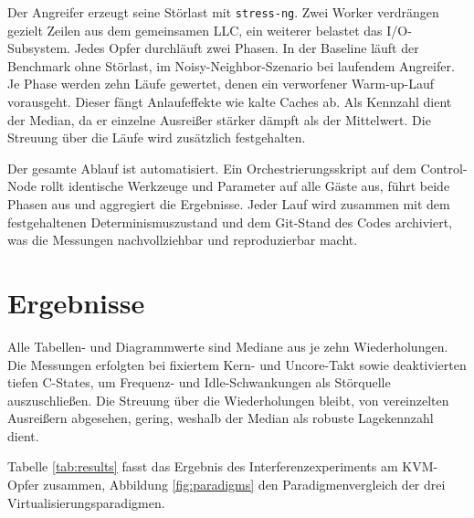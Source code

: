 \documentclass[conference]{IEEEtran}
\begin{document}
Der Angreifer erzeugt seine Störlast mit \texttt{stress-ng}. Zwei Worker verdrängen gezielt Zeilen aus dem gemeinsamen LLC, ein weiterer belastet das I/O-Subsystem. Jedes Opfer durchläuft zwei Phasen. In der Baseline läuft der Benchmark ohne Störlast, im Noisy-Neighbor-Szenario bei laufendem Angreifer. Je Phase werden zehn Läufe gewertet, denen ein verworfener Warm-up-Lauf vorausgeht. Dieser fängt Anlaufeffekte wie kalte Caches ab. Als Kennzahl dient der Median, da er einzelne Ausreißer stärker dämpft als der Mittelwert. Die Streuung über die Läufe wird zusätzlich festgehalten.

Der gesamte Ablauf ist automatisiert. Ein Orchestrierungsskript auf dem Control-Node rollt identische Werkzeuge und Parameter auf alle Gäste aus, führt beide Phasen aus und aggregiert die Ergebnisse. Jeder Lauf wird zusammen mit dem festgehaltenen Determinismuszustand und dem Git-Stand des Codes archiviert, was die Messungen nachvollziehbar und reproduzierbar macht.

\section{Ergebnisse}
Alle Tabellen- und Diagrammwerte sind Mediane aus je zehn Wiederholungen. Die Messungen erfolgten bei fixiertem Kern- und Uncore-Takt sowie deaktivierten tiefen C-States, um Frequenz- und Idle-Schwankungen als Störquelle auszuschließen. Die Streuung über die Wiederholungen bleibt, von vereinzelten Ausreißern abgesehen, gering, weshalb der Median als robuste Lagekennzahl dient.

Tabelle \ref{tab:results} fasst das Ergebnis des Interferenzexperiments am KVM-Opfer zusammen, Abbildung \ref{fig:paradigms} den Paradigmenvergleich der drei Virtualisierungsparadigmen.

\begin{table}[htbp]
\caption{Interferenzexperiment am KVM-Opfer: Median je Metrik aus zehn Läufen, Baseline gegen Noisy Neighbor.}
\centering
\footnotesize
\setlength{\tabcolsep}{3pt}%
\label{tab:results}
\end{table}
\end{document}
